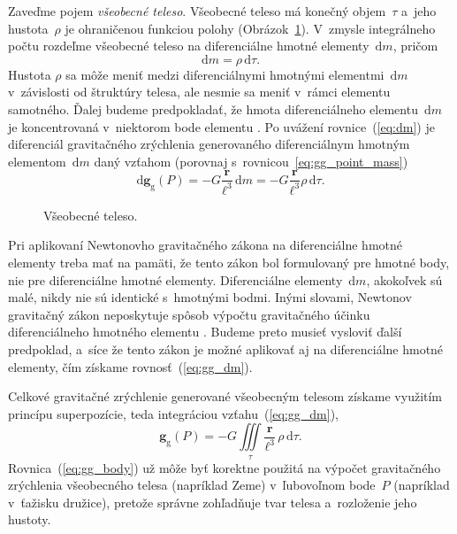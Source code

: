 \documentclass[a4paper, 12pt]{book}
\newcommand{\diff}{\mathrm d}
\newcommand{\gidx}{\mathrm g}
\let\vec\mathbf
\begin{document}
Zaveďme pojem \emph{všeobecné teleso}.  Všeobecné teleso má konečný 
objem~$\tau$ a~jeho hustota~$\rho$ je ohraničenou funkciou polohy 
(Obrázok~\ref{fig:gravitating_body}).  V~zmysle integrálneho počtu rozdeľme 
všeobecné teleso na diferenciálne hmotné elementy~$\diff m$, pričom
%
\begin{equation}
\label{eq:dm}
\diff m = \rho \, \diff \tau{.}
\end{equation}
%
Hustota $\rho$ sa môže meniť medzi diferenciálnymi hmotnými elementmi~$\diff m$ 
v~závislosti od štruktúry telesa, ale nesmie sa meniť v~rámci elementu 
samotného.  Ďalej budeme predpokladať, že hmota diferenciálneho elementu~$\diff 
m$ je koncentrovaná v~niektorom bode elementu \parencite{Kellogg1967}.  Po 
uvážení rovnice~(\ref{eq:dm}) je diferenciál gravitačného zrýchlenia 
generovaného diferenciálnym hmotným elementom~$\diff m$ daný vzťahom (porovnaj 
s~rovnicou~\ref{eq:gg_point_mass})
%
\begin{equation}
\label{eq:gg_dm}
\diff \vec g_\gidx(P) = -G \frac{\vec r}{\ell^3} \, \diff m = -G \frac{\vec 
r}{\ell^3} \rho \, \diff\tau{.}
\end{equation}

\begin{figure}
\centering

\caption{Všeobecné teleso.}
\label{fig:gravitating_body}
\end{figure}

Pri aplikovaní Newtonovho gravitačného zákona na diferenciálne hmotné elementy 
treba mať na pamäti, že tento zákon bol formulovaný pre hmotné body, nie pre 
diferenciálne hmotné elementy.  Diferenciálne elementy~$\diff m$, akokoľvek sú 
malé, nikdy nie sú identické s~hmotnými bodmi.  Inými slovami, Newtonov 
gravitačný zákon neposkytuje spôsob výpočtu gravitačného účinku diferenciálneho 
hmotného elementu \parencite{Kellogg1967}.  Budeme preto musieť vysloviť ďalší 
predpoklad, a~síce že tento zákon je možné aplikovať aj na diferenciálne hmotné 
elementy, čím získame rovnosť~(\ref{eq:gg_dm}).

Celkové gravitačné zrýchlenie generované všeobecným telesom získame
využitím princípu superpozície, teda integráciou vzťahu~(\ref{eq:gg_dm}),
%
\begin{equation}
\label{eq:gg_body}
\vec g_\gidx(P) = -G \iiint\limits_{\tau} \frac{\vec r}{\ell^3} \, \rho \, 
\diff\tau{.}
\end{equation}
%
Rovnica~(\ref{eq:gg_body}) už môže byť korektne použitá na výpočet gravitačného 
zrýchlenia všeobecného telesa (napríklad Zeme) v~ľubovoľnom bode~$P$ (napríklad 
v~ťažisku družice), pretože správne zohľadňuje tvar telesa a~rozloženie jeho 
hustoty.
\end{document}
